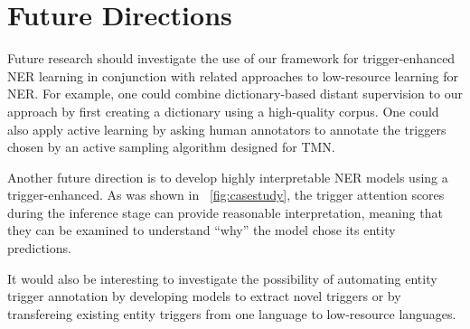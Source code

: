 




\section{Future Directions}
Future research should investigate the use of our framework for trigger-enhanced NER learning in conjunction with related approaches to low-resource learning for NER. 
For example, one could combine dictionary-based distant supervision to our approach by first creating a dictionary using a high-quality corpus. One could also apply active learning by asking human annotators to annotate the triggers chosen by an active sampling algorithm designed for TMN.

Another future direction is to develop highly interpretable NER models using a trigger-enhanced. As was shown in ~\ref{fig:casestudy}, the trigger attention scores during the inference stage can provide reasonable interpretation, meaning that they can be examined to understand ``why'' the model chose its entity predictions. %

It would also be interesting to investigate the possibility of automating entity trigger annotation by developing models to extract novel triggers or by transfereing existing entity triggers from one language to low-resource languages.